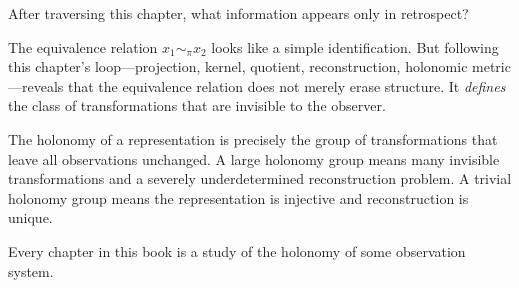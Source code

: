 \begin{HolonomyNote}
  After traversing this chapter, what information appears only
  in retrospect?

  The equivalence relation $x_1 \sim_\pi x_2$ looks like a
  simple identification.
  But following this chapter's loop---projection, kernel,
  quotient, reconstruction, holonomic metric---reveals that the
  equivalence relation does not merely erase structure.
  It \emph{defines} the class of transformations that are
  invisible to the observer.

  The holonomy of a representation is precisely the group of
  transformations that leave all observations unchanged.
  A large holonomy group means many invisible transformations
  and a severely underdetermined reconstruction problem.
  A trivial holonomy group means the representation is injective
  and reconstruction is unique.

  Every chapter in this book is a study of the holonomy of
  some observation system.
\end{HolonomyNote}
